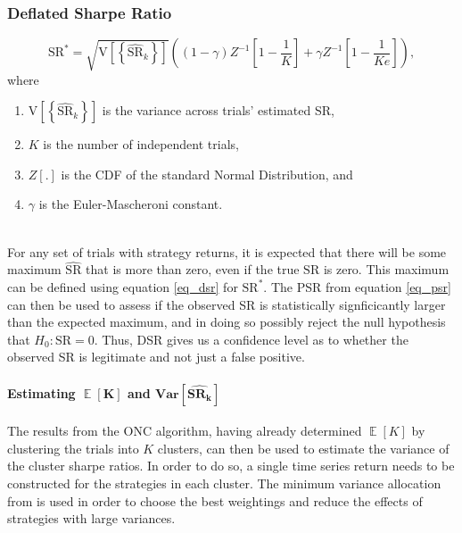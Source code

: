 \documentclass[a4paper,11pt,oneside]{article}
\newcommand{\Var}{\mathbf{Var}}
\DeclareMathOperator*{\E}{\mathbb{E}}
\theoremstyle{plain}
\theoremstyle{definition}
\begin{document}
		\subsubsection{Deflated Sharpe Ratio}\label{imp_dsr_detail}
	\begin{equation}\label{eq_dsr}
	\mathrm{SR}^{*}=\sqrt{\mathrm{V}\left[\left\{\widehat{\mathrm{SR}}_{k}\right\}\right]}\left((1-\gamma) Z^{-1}\left[1-\frac{1}{K}\right]+\gamma Z^{-1}\left[1-\frac{1}{K e}\right]\right), 
	\end{equation}
	where
	\begin{enumerate}
		\item $\mathrm{V}\left[\left\{\widehat{\mathrm{SR}}_{k}\right\}\right]$ is the variance across trials' estimated SR, 
		\item $K$ is the number of independent trials, 
		\item $Z[.]$ is the CDF of the standard Normal Distribution, and
		\item $\gamma$ is the Euler-Mascheroni constant.
	\end{enumerate}
	~\\
	For any set of trials with strategy returns, it is expected that there will be some maximum $\widehat{\mathrm{SR}}$ that is more than zero, even if the true $\mathrm{SR}$ is zero. This maximum can be defined using equation \eqref{eq_dsr} for $\mathrm{SR}^*$. The PSR from equation \eqref{eq_psr} can then be used to assess if the observed SR is statistically signficicantly larger than the expected maximum, and in doing so possibly reject the null hypothesis that $H_0: \mathrm{SR} = 0$. Thus, DSR gives us a confidence level as to whether the observed SR is legitimate and not just a false positive.
	
	\paragraph{Estimating $\mathbf{\E}\left[\mathbf{K}\right]$ and $\mathbf{\Var}\left[\widehat{\mathbf{SR_k}}\right]$}\label{dsr_cluster_estimates}
	
	The results from the ONC algorithm, having already determined $\mathbf{\E}\left[K\right]$ by clustering the trials into $K$ clusters, can then be used to estimate the variance of the cluster sharpe ratios. In order to do so, a single time series return needs to be constructed for the strategies in each cluster. The minimum variance allocation from \citet{LopezPrado2016a} is used in order to choose the best weightings and reduce the effects of strategies with large variances.\newline
\end{document}
